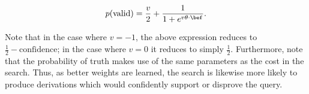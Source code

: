 \vspace{-0.5em}
\begin{equation}
  p(\textrm{valid}) = \frac{v}{2} + \frac{1}{1 + e^{v \theta \cdot \bef}}.
  \label{eqn:prob}
\end{equation}
\vspace{-0.5em}

Note that in the case where $v=-1$, the above expression reduces to
  $\frac{1}{2} - \textrm{confidence}$; in the case where $v=0$ it
  reduces to simply $\frac{1}{2}$.
Furthermore, note that the probability of truth makes use of the same
  parameters as the cost in the search.
Thus, as better weights are learned, the search is likewise more likely
  to produce derivations which would confidently support or disprove the
  query.
